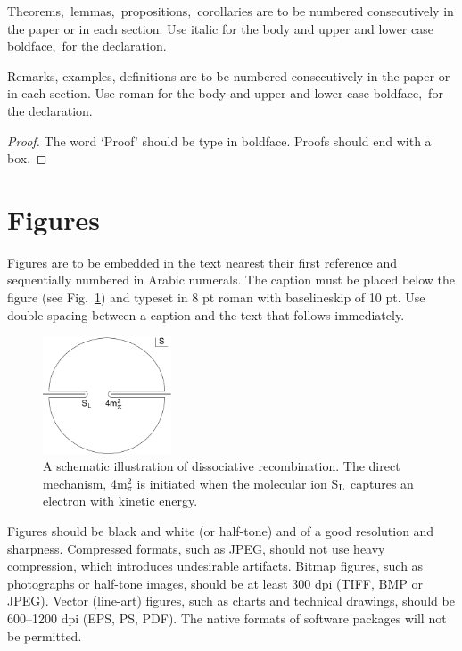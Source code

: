 \documentclass{ws-ijmpa}
\begin{document}
\begin{theorem}
Theorems$,$ lemmas$,$ propositions$,$ corollaries are to be numbered
consecutively in the paper or in each section. Use italic for the
body and upper and lower case boldface$,$ for the declaration.
\end{theorem}

\begin{remark}
Remarks, examples, definitions are to be numbered
consecutively in the paper or in each section. Use roman for the
body and upper and lower case boldface$,$ for the declaration.
\end{remark}

\begin{proof}
The word `Proof' should be type in boldface. Proofs
should end with\break
a box.
\end{proof}

\section{Figures}

Figures are to be embedded in the text nearest their first reference
and sequentially numbered in Arabic numerals. The caption must be
placed below the figure (see Fig.~\ref{f1}) and typeset in 8 pt roman with
baselineskip of 10 pt. Use double spacing between a caption and the
text that follows immediately.

\begin{figure}[b]
\centerline{\includegraphics[width=3.8cm]{ijmpaf1}}
\caption{A schematic illustration of dissociative recombination. The
direct mechanism, 4m$^2_\pi$ is initiated when the
molecular ion S$_{\rm L}$ captures an electron with
kinetic energy. \label{f1}}
\end{figure}

Figures should be black and white (or half-tone) and of a good
resolution and sharpness. Compressed formats, such as JPEG, should not
use heavy compression, which introduces undesirable artifacts. Bitmap
figures, such as photographs or half-tone images, should be at least
300 dpi (TIFF, BMP or JPEG). Vector (line-art) figures, such as
charts and technical drawings, should be 600--1200 dpi (EPS, PS,
PDF). The native formats of software packages will not be permitted.
\end{document}
